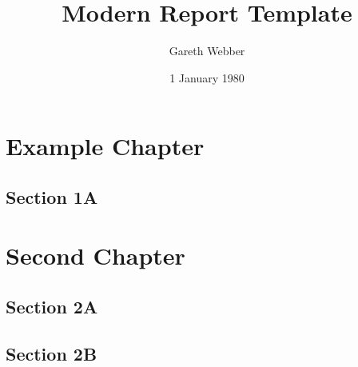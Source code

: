 \documentclass[11pt]{report}
\begin{document}
\title{Modern Report Template}
\date{1 January 1980}
\author{Gareth Webber}
\covertext{\lipsum[1]}
\maketitle

\tableofcontents

\chapter{Example Chapter}
\lipsum[2-5]
\section{Section 1A}
\lipsum[6-10]
\chapter{Second Chapter}
\lipsum[11-15]
\section{Section 2A}
\lipsum[16-20]
\section{Section 2B}
\lipsum[20-24]
\end{document}

